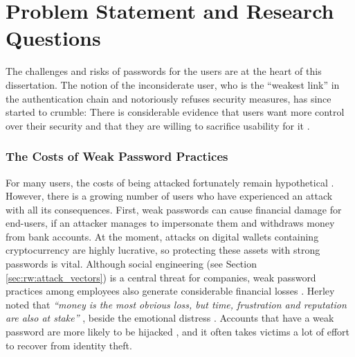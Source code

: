 
\section{Problem Statement and Research Questions}
The challenges and risks of passwords for the users are at the heart of this dissertation. 
The notion of the inconsiderate user, who is the ``weakest link'' in the authentication chain and notoriously refuses security measures, has since started to crumble: There is considerable evidence that users want more control over their security and that they are willing to sacrifice usability for it \cite{Kessem2018IBMFutureIdentity}. 

\subsubsection{The Costs of Weak Password Practices}
For many users, the costs of being attacked fortunately remain hypothetical \cite{Herley2015Counterfactuals}. However, there is a growing number of users who have experienced an attack with all its consequences. 
First, weak passwords can cause financial damage for end-users, if an attacker manages to impersonate them and withdraws money from bank accounts. At the moment, attacks on digital wallets containing cryptocurrency are highly lucrative, so protecting these assets with strong passwords is vital. Although social engineering (see Section \ref{sec:rw:attack_vectors}) is a central threat for companies, weak password practices among employees also generate considerable financial losses . 
Herley \etal noted that \textit{``money is the most obvious loss, but time, frustration and reputation are also at stake''} \cite{Herley2012PersistenceOfPasswords}, beside the emotional distress \cite{Shay2014ReligiousAunt}. Accounts that have a weak password are more likely to be hijacked \cite{Wang2016TargetedGuessingUnderestimated}, and it often takes victims a lot of effort to recover from identity theft. 

